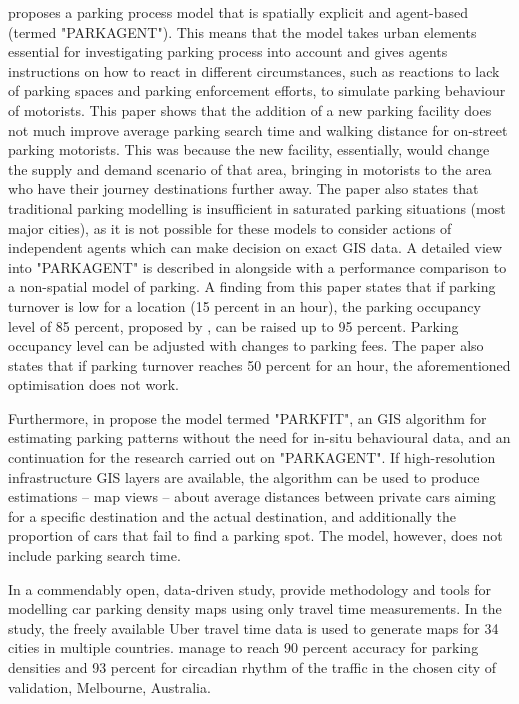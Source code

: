  proposes a parking process model that is spatially explicit and agent-based (termed "PARKAGENT"). This means that the model takes urban elements essential for investigating parking process into account and gives agents instructions on how to react in different circumstances, such as reactions to lack of parking spaces and parking enforcement efforts, to simulate parking behaviour of motorists. This paper shows that the addition of a new parking facility does not much improve average parking search time and walking distance for on-street parking motorists. This was because the new facility, essentially, would change the supply and demand scenario of that area, bringing in motorists to the area who have their journey destinations further away. The paper also states that traditional parking modelling is insufficient in saturated parking situations (most major cities), as it is not possible for these models to consider actions of independent agents which can make decision on exact GIS data. A detailed view into "PARKAGENT" is described in  alongside with a performance comparison to a non-spatial model of parking. A finding from this paper states that if parking turnover is low for a location (15 percent in an hour), the parking occupancy level of 85 percent, proposed by , can be raised up to 95 percent. Parking occupancy level can be adjusted with changes to parking fees. The paper also states that if parking turnover reaches 50 percent for an hour, the aforementioned optimisation does not work.

Furthermore, in  propose the model termed "PARKFIT", an GIS algorithm for estimating parking patterns without the need for in-situ behavioural data, and an continuation for the research carried out on "PARKAGENT". If high-resolution infrastructure GIS layers are available, the algorithm can be used to produce estimations -- map views -- about average distances between private cars aiming for a specific destination and the actual destination, and additionally the proportion of cars that fail to find a parking spot. The model, however, does not include parking search time. 

In a commendably open, data-driven study,  provide methodology and tools for modelling car parking density maps using only travel time measurements. In the study, the freely available Uber travel time data is used to generate maps for 34 cities in multiple countries. \citeauthor{Aryandoust2019} manage to reach 90 percent accuracy for parking densities and 93 percent for circadian rhythm of the traffic in the chosen city of validation, Melbourne, Australia.

